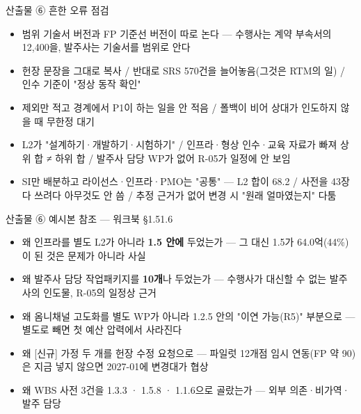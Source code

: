 \begin{frame}{산출물 ⑥ 흔한 오류 점검}
\begin{itemize}
\item 범위 기술서 버전과 FP 기준선 버전이 따로 논다 — 수행사는 계약 부속서의 12,400을, 발주사는 기술서를 범위로 안다
\item 헌장 문장을 그대로 복사 / 반대로 SRS 570건을 늘어놓음(그것은 RTM의 일) / 인수 기준이 "정상 동작 확인"
\item 제외만 적고 경계에서 P1이 하는 일을 안 적음 / 폴백이 비어 상대가 인도하지 않을 때 무한정 대기
\item L2가 "설계하기·개발하기·시험하기" / 인프라·형상 인수·교육 자료가 빠져 상위 합 ≠ 하위 합 / 발주사 담당 WP가 없어 R-05가 일정에 안 보임
\item SI만 배분하고 라이선스·인프라·PMO는 "공통" — L2 합이 68.2 / 사전을 43장 다 쓰려다 아무것도 안 씀 / 추정 근거가 없어 변경 시 "원래 얼마였는지" 다툼
\end{itemize}
\end{frame}

\begin{frame}{산출물 ⑥ 예시본 참조 — 워크북 §1.5\til{}1.6}
\begin{itemize}
\item 왜 인프라를 별도 L2가 아니라 \textbf{1.5 안에} 두었는가 — 그 대신 1.5가 64.0억(44\%)이 된 것은 문제가 아니라 사실
\item 왜 발주사 담당 작업패키지를 \textbf{10개}나 두었는가 — 수행사가 대신할 수 없는 발주사의 인도물, R-05의 일정상 근거
\item 왜 옴니채널 고도화를 별도 WP가 아니라 1.2.5 안의 "이연 가능(R5)" 부분으로 — 별도로 빼면 첫 예산 압력에서 사라진다
\item 왜 [신규] 가정 두 개를 헌장 수정 요청으로 — 파일럿 12개점 임시 연동(FP 약 90)은 지금 넣지 않으면 2027-01에 변경대가 협상
\item 왜 WBS 사전 3건을 1.3.3 · 1.5.8 · 1.1.6으로 골랐는가 — 외부 의존·비가역·발주 담당
\end{itemize}
\end{frame}

